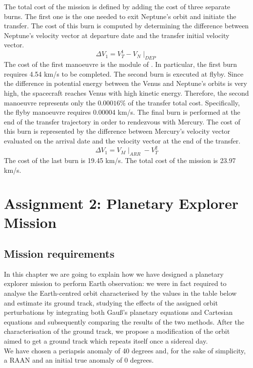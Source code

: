 \documentclass[11pt,a4paper]{report}
\begin{document}
The total cost of the mission is defined by adding the cost of three separate burns. 
The first one is the one needed to exit Neptune’s orbit and initiate the transfer. The cost of this burn is computed by determining the difference between Neptune’s velocity vector at departure date and the transfer initial velocity vector.
\begin{equation*}
    \Delta V_1 = V_T^1 - V_{N}\mid_{DEP}
\end{equation*}
The cost of the first manoeuvre is the module of . In particular, the first burn requires 4.54 km/s to be completed.
The second burn is executed at flyby. Since the difference in potential energy between the Venus and Neptune’s orbits is very high, the spacecraft reaches Venus with high kinetic energy. Therefore, the second manoeuvre represents only the $0.00016\%$ of the transfer total cost. Specifically, the flyby manoeuvre requires 0.00004 km/s.
The final burn is performed at the end of the transfer trajectory in order to rendezvous with Mercury. The cost of this burn is represented by the difference between Mercury’s velocity vector evaluated on the arrival date and the velocity vector at the end of the transfer.
\begin{equation*}
    \Delta V_1 = V_{M}\mid_{ARR}- V_T^2
\end{equation*}
The cost of the last burn is 19.45 km/s.
The total cost of the mission is 23.97 km/s.

\chapter{Assignment 2: Planetary Explorer Mission}

\section{Mission requirements}
In this chapter we are going to explain how we have designed a planetary explorer
mission to perform Earth observation: we were in fact required to analyse the Earth-centred orbit characterised by the values in the table below and estimate its ground track, studying the effects of the assigned orbit perturbations by integrating both Gauß’s planetary equations and Cartesian equations and subsequently comparing the results of the two methods. After the characterisation of the ground track, we propose a modification of the orbit aimed to get a ground track which repeats itself once a sidereal day.\\
We have chosen a periapsis anomaly of 40 degrees and, for the sake of simplicity, a RAAN and an initial true anomaly of 0 degrees.
\end{document}
